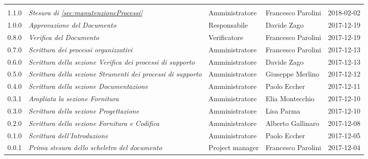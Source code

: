 \newpage 
\section*{}
\begin{table}[H]
	\centering
	\begin{tabular}{p{2cm}|C{4cm}|C{3cm}|R{3cm}|R{2cm}}

		
		
		 &  & &  & \\
		

		1.1.0  & \emph{Stesura di \ref{sec:manutenzioneProcessi}} &  Amministratore & Francesco Parolini & 2018-02-02  \\
		\hline
		
		1.0.0  & \emph{Approvazione del Documento} & Responsabile & Davide Zago &  2017-12-19 \\
		\hline
		
		0.8.0  &  \emph{Verifica del Documento} & Verificatore & Francesco Parolini & 2017-12-19 \\
		\hline
		
		0.7.0  & \emph{Scrittura dei processi organizzativi}  & Amministratore & Francesco Parolini & 2017-12-13\\
		\hline
		
		0.6.0  & \emph{Scrittura della sezione Verifica dei processi di supporto} &  Amministratore & Davide Zago  & 2017-12-13 \\
		\hline
		
		0.5.0  & \emph{Scrittura della sezione Strumenti dei processi di supporto} & Amministratore & Giuseppe Merlino & 2017-12-12\\
		\hline
		
	   	0.4.0  &\emph{Scrittura della sezione Documentazione}& Amministratore & Paolo Eccher  & 2017-12-11 \\
		\hline
		
		 0.3.1 & \emph{Ampliata la sezione Fornitura}& Amministratore & Elia Montecchio & 2017-12-10 \\
		\hline
		
		0.3.0 & \emph{Scrittura della sezione Progettazione} & Amministratore & Lisa Parma & 2017-12-10 \\
		\hline
					
		0.2.0 & \emph{Scrittura della sezione Fornitura e Codifica} & Amministratore & Alberto Gallinaro & 2017-12-08 \\
		\hline
		
		0.1.0 & \emph{Scrittura dell'Introduzione} & Amministratore & Paolo Eccher & 2017-12-05 \\
		\hline
		
		0.0.1 &\emph{Prima stesura dello scheletro del documento} &  Project manager & Francesco Parolini & 2017-12-04 \\
	

	\end{tabular}
	
\end{table}


\clearpage